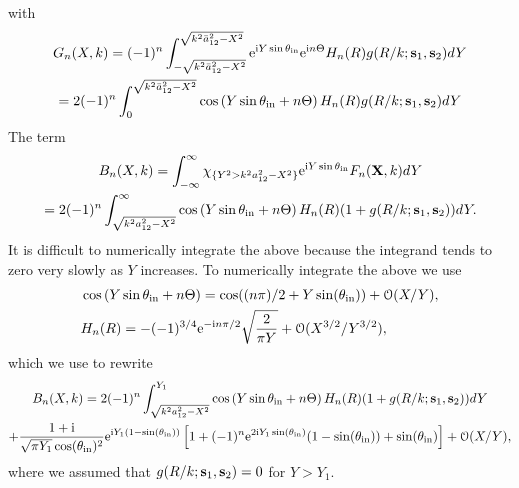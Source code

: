 \documentclass[12pt, a4paper]{article}
\begin{document}
 with
\begin{multline}
G_n(X, k) = (-1)^{n} \int_{-\sqrt{k^2 \bar a_{12}^2 - X^2}}^{\sqrt{k^2\bar a_{12}^2 - X^2}} \textrm{e}^{\textrm{i} Y \sin\theta_{\mathrm{in}}}
  \textrm{e}^{\textrm{i} n \Theta} H_{n}(R)g(R/k;  \mathbf s_1,\mathbf s_2) d Y
  \\ = 2 (-1)^{n} \int_{0}^{\sqrt{k^2\bar a_{12}^2 - X^2}} \cos\left(Y \sin\theta_{\mathrm{in}} + n \Theta\right) H_{n}(R)g(R/k;  \mathbf s_1,\mathbf s_2) d Y
\end{multline}
The term
\begin{multline}
  B_n(X,k) = \int_{-\infty}^{\infty} \chi_{\{ Y^2> k^2 a_{12}^2 - X^2\}} \textrm{e}^{\textrm{i} Y \sin\theta_{\mathrm{in}}}
   F_{n}(\mathbf X,k) d Y
  \\
  = 2(-1)^{n} \int_{\sqrt{k^2 a_{12}^2 - X^2}}^\infty \cos \left( Y \sin\theta_{\mathrm{in}} +  n \Theta\right) H_{n}(R)( 1 + g(R/k;  \mathbf s_1,\mathbf s_2)) d Y.
\end{multline}
It is difficult to numerically integrate the above because the integrand tends to zero very slowly as $Y$ increases. To numerically integrate the above we use
\begin{align}
  & \cos \left( Y \sin\theta_{\mathrm{in}} +  n \Theta\right) = \cos((n \pi)/2 + Y \sin(\theta_{\mathrm{in}})) + \mathcal O(X/Y),
  \\
  & H_{n}(R) =  -(-1)^{3/4} \textrm{e}^{-\textrm{i} n \pi /2} \sqrt{\frac{2}{\pi Y}} + \mathcal O(X^{3/2}/Y^{3/2}),
\end{align}
which we use to rewrite
\begin{multline}
  B_n(X,k) = 2(-1)^{n} \int_{\sqrt{k^2 a_{12}^2 - X^2}}^{Y_1} \cos \left( Y \sin\theta_{\mathrm{in}} +  n \Theta\right) H_{n}(R)( 1 + g(R/k;  \mathbf s_1,\mathbf s_2)) d Y
  \\ + \frac{1 + \textrm{i}}{\sqrt{\pi Y_1} \cos(\theta_{\mathrm{in}})^2} \textrm{e}^{\textrm{i}  Y_1 (1 - \sin(\theta_{\mathrm{in}}))}
  \left[ 1 + (-1)^n \textrm{e}^{2 \textrm{i} Y_1 \sin(\theta_{\mathrm{in}})} (1 - \sin(\theta_{\mathrm{in}})) + \sin(\theta_{\mathrm{in}}) \right] + \mathcal O(X/Y),
\end{multline}
where we assumed that $g(R/k;  \mathbf s_1,\mathbf s_2) =0$ for $Y>Y_1$.
\end{document}
